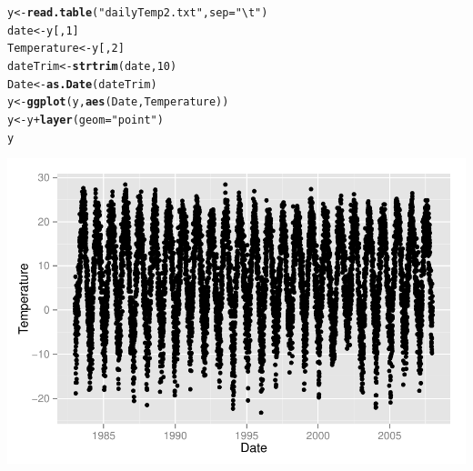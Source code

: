 \documentclass{article}\usepackage{graphicx, color}
\makeatletter
\def\maxwidth{ %
  \ifdim\Gin@nat@width>\linewidth
    \linewidth
  \else
    \Gin@nat@width
  \fi
}
\newcommand{\hlfunctioncall}[1]{\textcolor[rgb]{0.501960784313725,0,0.329411764705882}{\textbf{#1}}}%
\newcommand{\hlstring}[1]{\textcolor[rgb]{0.6,0.6,1}{#1}}%
\newenvironment{kframe}{%
 \def\at@end@of@kframe{}%
 \ifinner\ifhmode%
  \def\at@end@of@kframe{\end{minipage}}%
  \begin{minipage}{\columnwidth}%
 \fi\fi%
 \def\FrameCommand##1{\hskip\@totalleftmargin \hskip-\fboxsep
 \colorbox{shadecolor}{##1}\hskip-\fboxsep
     \hskip-\linewidth \hskip-\@totalleftmargin \hskip\columnwidth}%
 \MakeFramed {\advance\hsize-\width
   \@totalleftmargin\z@ \linewidth\hsize
   \@setminipage}}%
 {\par\unskip\endMakeFramed%
 \at@end@of@kframe}
\newenvironment{knitrout}{}{} %
\makeatother
\begin{document}
\begin{knitrout}
\color{fgcolor}\begin{kframe}
\begin{alltt}
y <- \hlfunctioncall{read.table}(\hlstring{"dailyTemp2.txt"}, sep = \hlstring{"\textbackslash{}t"})
date <- y[, 1]
Temperature <- y[, 2]
dateTrim <- \hlfunctioncall{strtrim}(date, 10)
Date <- \hlfunctioncall{as.Date}(dateTrim)
y <- \hlfunctioncall{ggplot}(y, \hlfunctioncall{aes}(Date, Temperature))
y <- y + \hlfunctioncall{layer}(geom = \hlstring{"point"})
y
\end{alltt}


{\ttfamily\noindent\color{warningcolor}{\#\# Warning: Removed 1 rows containing missing values (geom\_point).}}\end{kframe}
\includegraphics[width=\maxwidth]{figure/graph3} 

\end{knitrout}
\end{document}
